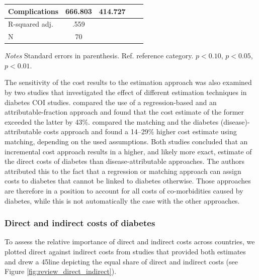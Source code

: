 \begin{table}[p]
\begin{center}
\begin{adjustbox}{max width=\linewidth}
\begin{threeparttable}
{\begin{tabular}{l*{2}{SS}}
                Complications & 666.803 & 414.727 \\
\midrule
                R-squared adj. & .559 &  \\
                N & 70 &  \\ 
 \bottomrule
\end{tabular}
\begin{tablenotes}
\item \footnotesize \textit{Notes} Standard errors in parenthesis. Ref. reference category.
\sym{*} \(p<0.10\), \sym{**} \(p<0.05\), \sym{***} \(p<0.01\).
\end{tablenotes}
}
\end{threeparttable}
\end{adjustbox}
\end{center}
\end{table}

The sensitivity of the cost results to the estimation approach was also examined by two studies that investigated the effect of different estimation techniques in diabetes \ac{COI} studies. \textcite{Honeycutt2009a} compared the use of a regression-based and an attributable-fraction approach and found that the cost estimate of the former exceeded the latter by 43\%. \textcite{Tunceli2010c} compared the matching and the diabetes (disease)-attributable costs approach and found a 14--29\% higher cost estimate using matching, depending on the used assumptions. Both studies concluded that an incremental cost approach results in a higher, and likely more exact, estimate of the direct costs of diabetes than disease-attributable approaches. The authors attributed this to the fact that a regression or matching approach can assign costs to diabetes that cannot be linked to diabetes otherwise. Those approaches are therefore in a position to account for all costs of co-morbidities caused by diabetes, while this is not automatically the case with the other approaches.

\subsubsection{Direct and indirect costs of diabetes}

To assess the relative importance of direct and indirect costs across countries, we plotted direct against indirect costs from studies that provided both estimates and drew a 45\degree line depicting the equal share of direct and indirect costs (see Figure \ref{fig:review_direct_indirect}).

